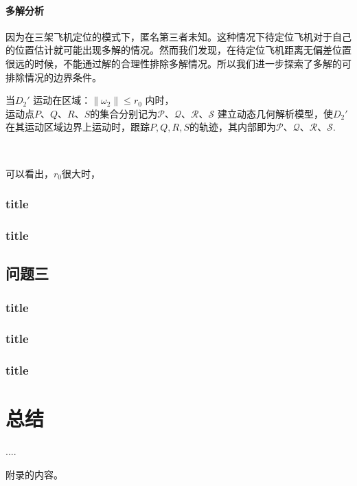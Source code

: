 \documentclass{cumcmthesis}
\begin{document}
		
			\paragraph{多解分析}
			因为在三架飞机定位的模式下，匿名第三者未知。这种情况下待定位飞机对于自己的位置估计就可能出现多解的情况。然而我们发现，在待定位飞机距离无偏差位置很远的时候，不能通过解的合理性排除多解情况。所以我们进一步探索了多解的可排除情况的边界条件。
			
			
			当$ D_2' $ 运动在区域：$ \lVert \omega _2 \rVert \le r_0 $ 内时，$ \text{运动点}P\text{、}Q\text{、}R\text{、}S\text{的集合分别记为}\mathcal{P}\text{、}\mathcal{Q}\text{、}\mathcal{R}\text{、}\mathcal{S} $ 建立动态几何解析模型，使$ D_2' $在其运动区域边界上运动时，跟踪$P,Q,R,S$的轨迹，其内部即为$\mathcal{P}\text{、}\mathcal{Q}\text{、}\mathcal{R}\text{、}\mathcal{S}$.
			
			\begin{figure}[htb]
				\centering
				\\
				\caption{}
				\label{fig7}
			\end{figure}
			可以看出，$r_0$很大时，
			\subsubsection{title}
			\subsubsection{title}
		\subsection{问题三}
			\subsubsection{title}
			\subsubsection{title}
			\subsubsection{title}
	\section{总结}
	\begin{thebibliography}{9}%
		 ....
	\end{thebibliography}
	\begin{appendices}
		附录的内容。
	\end{appendices}
\end{document}
